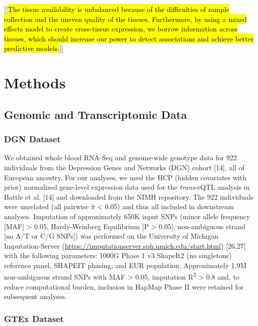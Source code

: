 \documentclass[]{article}
\begin{document}
[[\hl{The tissue availability is unbalanced because
  of the difficulties of sample collection and the uneven quality of the
  tissues. Furthermore, by using a mixed effects model to create
  cross-tissue expression, we borrow information across tissues, which
  should increase our power to detect associations and achieve better
  predictive models.}]]


\section{Methods}\label{methods}

\subsection{Genomic and Transcriptomic
Data}\label{genomic-and-transcriptomic-data}

\subsubsection{DGN Dataset}\label{dgn-dataset}

We obtained whole blood RNA-Seq and genome-wide genotype data for 922
individuals from the Depression Genes and Networks (DGN) cohort
{[}14{]}, all of European ancestry. For our analyses, we used the HCP
(hidden covariates with prior) normalized gene-level expression data
used for the \emph{trans}-eQTL analysis in Battle et al. {[}14{]} and
downloaded from the NIMH repository. The 922 individuals were unrelated
(all pairwise \(\hat{\pi}\) \textless{} 0.05) and thus all included in
downstream analyses. Imputation of approximately 650K input SNPs (minor
allele frequency {[}MAF{]} \textgreater{} 0.05, Hardy-Weinberg
Equilibrium {[}P \textgreater{} 0.05{]}, non-ambiguous strand {[}no A/T
or C/G SNPs{]}) was performed on the University of Michigan
Imputation-Server
(\url{https://imputationserver.sph.umich.edu/start.html}) {[}26,27{]}
with the following parameters: 1000G Phase 1 v3 ShapeIt2 (no singletons)
reference panel, SHAPEIT phasing, and EUR population. Approximately 1.9M
non-ambiguous strand SNPs with MAF \textgreater{} 0.05, imputation
R\textsuperscript{2} \textgreater{} 0.8 and, to reduce computational
burden, inclusion in HapMap Phase II were retained for subsequent
analyses.

\subsubsection{GTEx Dataset}\label{gtex-dataset}
\end{document}
